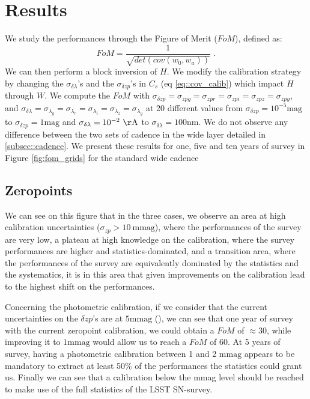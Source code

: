 \documentclass[\docopts]{\docclass}
\begin{document}
\section{Results}
\label{sec::results}
We study the performances through the Figure of Merit ($FoM$), defined as:
\begin{equation}
FoM = \frac{1}{\sqrt{det(cov(w_0, w_a))}} \text{ .}
\end{equation}
We can then perform a block inversion of $H$.
We modify the calibration strategy by changing the $\sigma_{\delta \lambda}$'s and the $\sigma_{\delta zp}$'s in $C_s$ (eq \ref{eq::cov_calib}) which impact $H$ through $W$.
We compute the $FoM$ with $\sigma_{\delta zp} = \sigma_{zpg} = \sigma_{zpr} = \sigma_{zpi} = \sigma_{zpz} = \sigma_{zpy}$, and $\sigma_{\delta\lambda} = \sigma_{\lambda_g} = \sigma_{\lambda_r} = \sigma_{\lambda_i} = \sigma_{\lambda_z} = \sigma_{\lambda_y}$ at 20 different values from $\sigma_{\delta zp} = 10^{-5}\mathrm{mag}$ to $\sigma_{\delta zp} = 1\mathrm{mag}$ and $\sigma_{\delta \lambda} = 10^{-2}\ \mathrm{\AA}$ to $\sigma_{\delta \lambda} = 100\mathrm{nm}$. We do not observe any difference between the two sets of cadence in the wide layer detailed in \ref{subsec::cadence}. We present these results for one, five and ten years of survey in Figure \ref{fig:fom_grids} for the standard wide cadence

\subsection{Zeropoints}
We can see on this figure that in the three cases, we observe an area at high calibration uncertainties ($\sigma_{zp} > 10\ \mathrm{mmag}$), where the performances of the survey are very low, a plateau at high knowledge on the calibration, where the survey performances are higher and statistics-dominated, and a transition area, where the performances of the survey are equivalently dominated by the statistics and the systematics, it is in this area that given improvements on the calibration lead to the highest shift on the performances.

Concerning the photometric calibration, if we consider that the current uncertainties on the $\delta zp$'s are at $5 \mathrm{mmag}$ (\cite{1401.4064}), we can see that one year of survey with the current zeropoint calibration, we could obtain a $FoM$ of $\approx 30$, while improving it to $1 \mathrm{mmag}$ would allow us to reach a $FoM$ of 60. At 5 years of survey, having a photometric calibration between 1 and 2 $\mathrm{mmag}$ appears to be mandatory to extract at least 50\% of the performances the statistics could grant us. Finally we can see that a calibration below the mmag level should be reached to make use of the full statistics of the LSST SN-survey.
\end{document}
